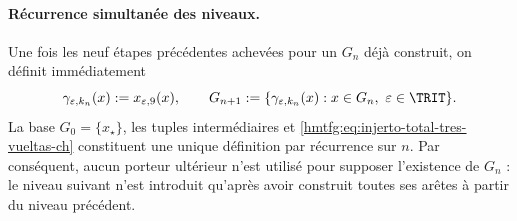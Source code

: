 \paragraph{Récurrence simultanée des niveaux.}
Une fois les neuf étapes précédentes achevées pour un \(G_n\) déjà construit,
on définit immédiatement
\begin{equation}
 \gamma_{\varepsilon,k_n}(x):=x_{\varepsilon,9}(x),\qquad
 G_{n+1}:=\{\gamma_{\varepsilon,k_n}(x):
       x\in G_n,\ \varepsilon\in\TRIT\}.
 \label{hmtfg:eq:injerto-total-tres-vueltas-ch}
\end{equation}
\label{hmtfg:eq:tres-vueltas-tpk-ch}
La base \(G_0=\{x_\star\}\), les tuples intermédiaires et
\eqref{hmtfg:eq:injerto-total-tres-vueltas-ch} constituent une unique définition par
récurrence sur \(n\). Par conséquent, aucun porteur ultérieur n’est utilisé pour
supposer l’existence de \(G_n\) : le niveau suivant n’est introduit
qu’après avoir construit toutes ses arêtes à partir du niveau précédent.

